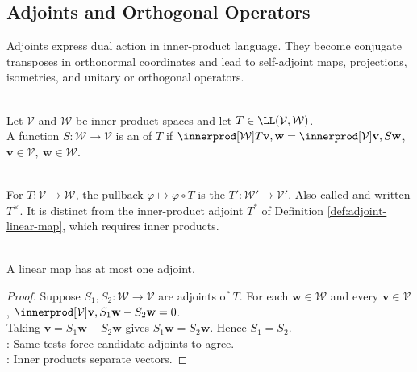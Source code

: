 \subsection{Adjoints and Orthogonal Operators}

%

Adjoints express dual action in inner-product language. They become conjugate transposes in orthonormal coordinates and lead to self-adjoint maps, projections, isometries, and unitary or orthogonal operators.

\begin{definition} \label{def:adjoint-linear-map} \\
Let $\mathcal{V}$ and $\mathcal{W}$ be inner-product spaces and let $T\in\LL(\mathcal{V},\mathcal{W})$.\\
A function $S:\mathcal{W}\to\mathcal{V}$ is an  of $T$ if $\innerprod[\mathcal{W}]{T\mathbf{v},\mathbf{w}} =\innerprod[\mathcal{V}]{\mathbf{v},S\mathbf{w}}$, $\mathbf{v}\in\mathcal{V},\ \mathbf{w}\in\mathcal{W}$.
\end{definition}

\begin{perspective} \label{per:dual-map-versus-inner-product-adjoint} \\
For $T:\mathcal{V}\to\mathcal{W}$, the pullback $\varphi\mapsto\varphi\circ T$ is the  $T':\mathcal{W}'\to\mathcal{V}'$. Also called  and written $T^\times$. It is distinct from the inner-product adjoint $T^*$ of Definition \ref{def:adjoint-linear-map}, which requires inner products.
\end{perspective}

\begin{lemma} \label{lem:adjoint-unique-if-exists} \\
A linear map has at most one adjoint.
\begin{proof}
Suppose $S_1,S_2:\mathcal{W}\to\mathcal{V}$ are adjoints of $T$. For each $\mathbf{w}\in\mathcal{W}$ and every $\mathbf{v}\in\mathcal{V}$, $\innerprod[\mathcal{V}]{\mathbf{v},S_1\mathbf{w}-S_2\mathbf{w}}=0$.\\
Taking $\mathbf{v}=S_1\mathbf{w}-S_2\mathbf{w}$ gives $S_1\mathbf{w}=S_2\mathbf{w}$. Hence $S_1=S_2$.\\
: Same tests force candidate adjoints to agree.\\
: Inner products separate vectors.
\end{proof}
\end{lemma}


